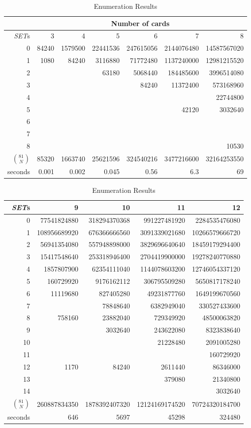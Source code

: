 \documentclass{article}
\newcommand{\SETs}{{\em SET}s}
\begin{document}
\begin{table}
  \caption{Enumeration Results}\label{THE_TABLE}
  \centering
  \begin{tabular}{r | r r r r r r }
    & \multicolumn{6}{c}{Number of cards} \\
    \hline\hline
    \SETs & 3 & 4 & 5 & 6 & 7 & 8   \\
    \hline
0  & 84240 & 1579500 & 22441536 & 247615056 & 2144076480 & 14587567020  \\
1  & 1080 & 84240 & 3116880 & 71772480 & 1137240000 & 12981215520 \\
2  &  &  & 63180 & 5068440 & 184485600 & 3996514080 \\
3  &  &  &  & 84240 & 11372400 & 573168960 \\
4  &  &  &  &  &  & 22744800 \\
5  &  &  &  &  & 42120 & 3032640 \\
6  &  &  &  &  &  &  \\
7  &  &  &  &  &  &  \\
8  &  &  &  &  &  & 10530 \\
\hline
$\binom{81}{N}$ & 85320 & 1663740 & 25621596 & 324540216 & 3477216600 & 32164253550  \\
\hline
seconds & 0.001 & 0.002 & 0.045 & 0.56 & 6.3 & 69 
  \end{tabular}

  \vskip 5mm

  \begin{tabular}{r | r r r r }
    \SETs & 9 & 10 & 11 & 12 \\
    \hline
0  & 77541824880 & 318294370368 & 991227481920 & 2284535476080 \\
1  & 108956689920 & 676366666560 & 3091339021680 & 10266579666720 \\
2  & 56941354080 & 557948898000 & 3829696640640 & 18459179294400 \\
3  & 15417548640 & 253318946400 & 2704419900000 & 19278240770880 \\
4  & 1857807900 & 62354111040 & 1144078603200 & 12746054337120 \\
5  & 160729920 & 9176162112 & 306795509280 & 5650817178240 \\
6  & 11119680 & 827405280 & 49231877760 & 1649199670560 \\
7  & & 78848640 & 6382949040 & 330527433600 \\
8  & 758160 & 23882040 & 729349920 & 48500063820 \\
9  &  & 3032640 & 243622080 & 8323838640 \\
10 &  &  & 21228480 & 2091005280 \\
11 &  &  & & 160729920 \\
12 & 1170 & 84240 & 2611440 & 86346000 \\
13 &  &  & 379080 & 21340800 \\
14 &  &  &  & 3032640 \\
\hline
$\binom{81}{N}$ & 260887834350 & 1878392407320 & 12124169174520 & 70724320184700 \\
\hline
seconds & 646 & 5697 & 45298 & 324480
  \end{tabular}
\end{table}
\end{document}
